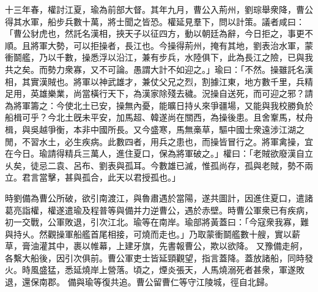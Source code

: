 \begin{pinyinscope}
 
十三年春，權討江夏，瑜為前部大督。其年九月，曹公入荊州，劉琮舉衆降，曹公得其水軍，船步兵數十萬，將士聞之皆恐。權延見羣下，問以計策。議者咸曰：「曹公豺虎也，然託名漢相，挾天子以征四方，動以朝廷為辭，今日拒之，事更不順。且將軍大勢，可以拒操者，長江也。今操得荊州，掩有其地，劉表治水軍，蒙衝鬬艦，乃以千數，操悉浮以沿江，兼有步兵，水陸俱下，此為長江之險，已與我共之矣。而勢力衆寡，又不可論。愚謂大計不如迎之。」瑜曰：「不然。操雖託名漢相，其實漢賊也。將軍以神武雄才，兼仗父兄之烈，割據江東，地方數千里，兵精足用，英雄樂業，尚當橫行天下，為漢家除殘去穢。況操自送死，而可迎之邪？請為將軍籌之：今使北土已安，操無內憂，能曠日持乆來爭疆場，又能與我校勝負於船楫可乎？今北土旣未平安，加馬超、韓遂尚在關西，為操後患。且舍鞌馬，杖舟楫，與吳越爭衡，本非中國所長。又今盛寒，馬無槀草，驅中國士衆遠涉江湖之閒，不習水土，必生疾病。此數四者，用兵之患也，而操皆冒行之。將軍禽操，宜在今日。瑜請得精兵三萬人，進住夏口，保為將軍破之。」權曰：「老賊欲廢漢自立乆矣，徒忌二袁、呂布、劉表與孤耳。今數雄已滅，惟孤尚存，孤與老賊，勢不兩立。君言當擊，甚與孤合，此天以君授孤也。」
 
 
時劉備為曹公所破，欲引南渡江，與魯肅遇於當陽，遂共圖計，因進住夏口，遣諸葛亮詣權，權遂遣瑜及程普等與備并力逆曹公，遇於赤壁。時曹公軍衆已有疾病，初一交戰，公軍敗退，引次江北。瑜等在南岸。瑜部將黃蓋曰：「今寇衆我寡，難與持乆。然觀操軍船艦首尾相接，可燒而走也。」乃取蒙衝鬬艦數十艘，實以薪草，膏油灌其中，裹以帷幕，上建牙旗，先書報曹公，欺以欲降。
 又豫備走舸，各繫大船後，因引次俱前。曹公軍吏士皆延頸觀望，指言蓋降。蓋放諸船，同時發火。時風盛猛，悉延燒岸上營落。頃之，煙炎張天，人馬燒溺死者甚衆，軍遂敗退，還保南郡。
 備與瑜等復共追。曹公留曹仁等守江陵城，徑自北歸。
 

\end{pinyinscope}
